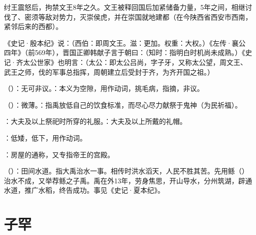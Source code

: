 {{\begin{lyenumerate}
\item 纣王震怒后，拘禁文王8年之久。文王被释回国后加紧储备力量，5年之间，相继讨伐了、密须等敌对势力，灭崇侯虎，并在崇国就地建都（在今陕西省西安市西南，紧邻后来的西都）。

\item 《史记·殷本纪》说：（西伯：即周文王。滋：更加。权重：大权。）《左传·襄公四年》（前569年），晋国正卿韩献子言于朝曰：（知时：指明白时机尚未成熟。）《史记·齐太公世家》也明言：（太公：即太公吕尚，字子牙，又称太公望，周文王、武王之师，伐的军事总指挥，周朝建立后受封于齐，为齐开国之祖。）
\end{lyenumerate}
}
}
{}


{
\item {}（）：无可非议。：本义为空隙，用作动词，挑毛病，指摘，非议。
\item {}（）：微薄。：指禹放低自己的饮食标准，而尽心尽力献祭于鬼神（为民祈福）。

\item {}：大夫及以上祭祀时所穿的礼服。：大夫及以上所戴的礼帽。
\item {}：低矮，低下，用作动词。
\item {}：房屋的通称，又专指帝王的宫殿。

\item {}（）：田间水道。指大禹治水一事。相传时洪水滔天，人民不胜其苦。先用鲧（）治水不成，又举荐鲧之子禹。禹在外13年，劳身焦思，开山导水，分州筑湖，辟通水道，推广水稻，终告成功。事见《史记·夏本纪》。
}
{}



\chapter{子罕}


